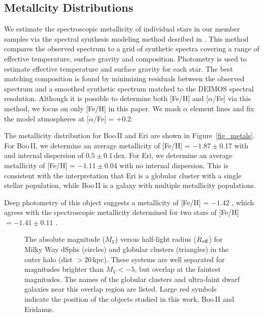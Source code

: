 \documentclass{../tex_files/emulateapj}
\begin{document}
\subsection{Metallcity Distributions}\label{ssec_tides}

We estimate the spectroscopic metallicity of individual stars in our
member samples via the spectral synthesis modeling method desribed in
\citet{kirby08a}.  This method compares the observed spectrum to a
grid of synthetic spectra covering a range of effective temperature,
surface gravity and composition.  Photometry is used to estimate
effective temperature and surface gravity for each star.  The best
matching composition is found by minimizing residuals between the
observed spectrum and a smoothed synthetic spectrum matched to the
DEIMOS spectral resolution.  Although it is possible to determine both
[Fe/H] and [$\alpha$/Fe] via this method, we focus on only [Fe/H] in
this paper.  We mask $\alpha$ element lines and fix the model
atmospheres at [$\alpha$/Fe] = $+0.2$.

The metallicity distribution for Boo\,II and Eri are shown in
Figure~\ref{fig_metals}.  For Boo\,II, we determine an average
metallicity of [Fe/H] = $-1.87\pm0.17$ with and internal dispersion of
$0.5\pm0.1$\,dex.  For Eri, we determine an average metallicity of
[Fe/H] = $-1.11\pm 0.04$ with no internal dispersion.  This is
consistent with the interpretation that Eri is a globular cluster with
a single stellar population, while Boo\,II is a galaxy with multiple
metallicity populations.

 Deep photometry of this object suggests a
metallicity of [Fe/H] = $-1.42$ \citep{stetson99a}, which agrees with
the spectroscopic metallicity determined for two stars of
[Fe/H]$=-1.41\pm 0.11$ \citep{armandroff91a}.




\begin{figure*}[t!]
\caption{The absolute magnitude ($M_V$) versus half-light radius
  ($R_{\rm eff}$) for Milky Way dSphs (circles) and globular clusters
  (triangles) in the outer halo (dist $> 20$\,kpc).  These systems are
  well separated for magnitudes brighter than $M_V< -5$,
  but overlap at the faintest magnitudes.  The names of the globular
  clusters and ultra-faint dwarf galaxies near this overlap region are
  listed.  Large red symbols indicate the position of the objects
  studied in this work, Boo\,II and Eridanus.  \label{fig_sizeMV}}
\end{figure*}
\end{document}
